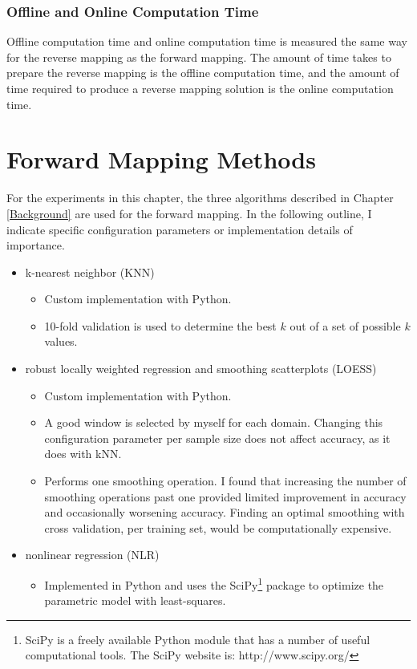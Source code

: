   \subsubsection{Offline and Online Computation Time}
Offline computation time and online computation time is measured the same way for the reverse mapping as the forward mapping.
The amount of time \fw takes to prepare the reverse mapping is the offline computation time, and the amount of time required to produce a reverse mapping solution is the online computation time.



\section{Forward Mapping Methods}\label{sec:fmalgo}

For the experiments in this chapter, the three algorithms described in Chapter \ref{Background} are used for the forward mapping. In the following outline, I indicate specific configuration parameters or implementation details of importance.
\begin{itemize}
 \item k-nearest neighbor (KNN)
  \begin{itemize}
   \item Custom implementation with Python.
   \item 10-fold validation is used to determine the best $k$ out of a set of possible $k$ values.
  \end{itemize}

 \item robust locally weighted regression and smoothing scatterplots (LOESS)
  \begin{itemize}
   \item Custom implementation with Python.
   \item A good window is selected by myself for each domain. Changing this configuration parameter per sample size does not affect accuracy, as it does with kNN.
   \item Performs one smoothing operation. I found that increasing the number of smoothing operations past one provided limited improvement in accuracy and occasionally worsening accuracy. Finding an optimal smoothing with cross validation, per training set, would be computationally expensive.
  \end{itemize}

 \item nonlinear regression (NLR)
   \begin{itemize}
      \item Implemented in Python and uses the SciPy\footnote{SciPy is a freely available Python module that has a number of useful computational tools. The SciPy website is: http://www.scipy.org/} package to optimize the parametric model with least-squares.
   \end{itemize}

\end{itemize}


